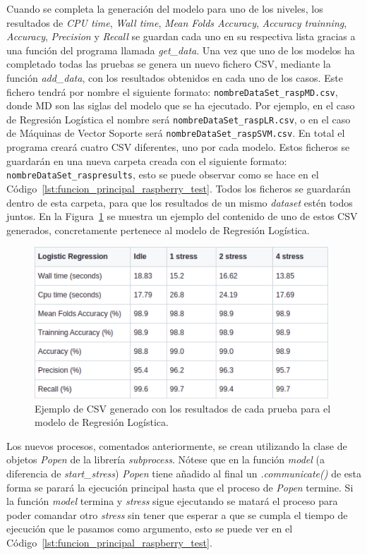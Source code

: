 \documentclass[a4paper, 12pt]{book}
\begin{document}
Cuando se completa la generación del modelo para uno de los niveles, los resultados de \textit{CPU time}, \textit{Wall time}, \textit{Mean Folds Accuracy}, \textit{Accuracy trainning}, \textit{Accuracy}, \textit{Precision} y \textit{Recall} se guardan cada uno en su respectiva lista gracias a una función del programa llamada \textit{get\_data}. Una vez que uno de los modelos ha completado todas las pruebas se genera un nuevo fichero CSV, mediante la función \textit{add\_data}, con los resultados obtenidos en cada uno de los casos.
Este fichero tendrá por nombre el siguiente formato: \texttt{nombreDataSet\_raspMD.csv}, donde MD son las siglas del modelo que se ha ejecutado. Por ejemplo, en el caso de Regresión Logística el nombre será \texttt{nombreDataSet\_raspLR.csv}, o en el caso de Máquinas de Vector Soporte será \texttt{nombreDataSet\_raspSVM.csv}. En total el programa creará cuatro CSV diferentes, uno por cada modelo. Estos ficheros se guardarán en una nueva carpeta creada con el siguiente formato: \texttt{nombreDataSet\_raspresults}, esto se puede observar como se hace en el Código~\ref{lst:funcion_principal_raspberry_test}. Todos los ficheros se guardarán dentro de esta carpeta, para que los resultados de un mismo \textit{dataset} estén todos juntos. En la Figura~\ref{fig:ejemplo_csv} se muestra un ejemplo del contenido de uno de estos CSV generados, concretamente pertenece al modelo de Regresión Logística.

\begin{figure}[htb]
  \centering
  \includegraphics[width=11cm, keepaspectratio]{img/ejemplo_csv.png}
  \caption{Ejemplo de CSV generado con los resultados de cada prueba para el modelo de Regresión Logística.}\label{fig:ejemplo_csv}
\end{figure}

Los nuevos procesos, comentados anteriormente, se crean utilizando la clase de objetos \textit{Popen} de la librería \textit{subprocess}. Nótese que en la función \textit{model} (a diferencia de \textit{start\_stress}) \textit{Popen} tiene añadido al final un \textit{.communicate()} de esta forma se parará la ejecución principal hasta que el proceso de \textit{Popen} termine. Si la función \textit{model} termina y \textit{stress} sigue ejecutando se matará el proceso para poder comandar otro \textit{stress} sin tener que esperar a que se cumpla el tiempo de ejecución que le pasamos como argumento, esto se puede ver en el Código~\ref{lst:funcion_principal_raspberry_test}.
\end{document}
